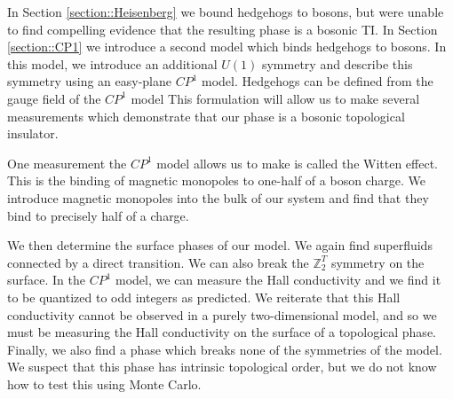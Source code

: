 \documentclass[prb,twocolumn]{revtex4-1}
\def\ztwo{\mathbb{Z}_2}
\def\ztwot{\mathbb{Z}_2^T}
\newcommand{\cp}{$CP^1$ }
\begin{document}
In Section \ref{section::Heisenberg} we bound hedgehogs to bosons, but were unable to find compelling evidence that the resulting phase is a bosonic TI.
In Section \ref{section::CP1} we introduce a second model which binds hedgehogs to bosons. In this model, we introduce an additional $U(1)$ symmetry and describe this symmetry using an easy-plane \cp model. Hedgehogs can be defined from the gauge field of the \cp model This formulation will allow us to make several measurements which demonstrate that our phase is a bosonic topological insulator.

One measurement the \cp model allows us to make is called the Witten effect.\cite{MaxWitten,Max} This is the binding of magnetic monopoles to one-half of a boson charge. We introduce magnetic monopoles into the bulk of our system and find that they bind to precisely half of a charge.

We then determine the surface phases of our model. We again find superfluids connected by a direct transition.  We can also break the $\ztwot$ symmetry on the surface. In the \cp model, we can measure the Hall conductivity and we find it to be quantized to odd integers as predicted. We reiterate that this Hall conductivity cannot be observed in a purely two-dimensional model, and so we must be measuring the Hall conductivity on the surface of a topological phase. Finally, we also find a phase which breaks none of the symmetries of the model. We suspect that this phase has intrinsic topological order, but we do not know how to test this using Monte Carlo.


\end{document}
